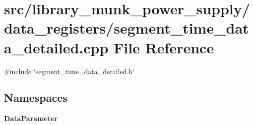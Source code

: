 \section{src/library\+\_\+munk\+\_\+power\+\_\+supply/data\+\_\+registers/segment\+\_\+time\+\_\+data\+\_\+detailed.cpp File Reference}
\label{segment__time__data__detailed_8cpp}
{\ttfamily \#include \char`\"{}segment\+\_\+time\+\_\+data\+\_\+detailed.\+h\char`\"{}}\newline
\subsection*{Namespaces}
\begin{DoxyCompactItemize}
\item 
 \textbf{ Data\+Parameter}
\end{DoxyCompactItemize}
